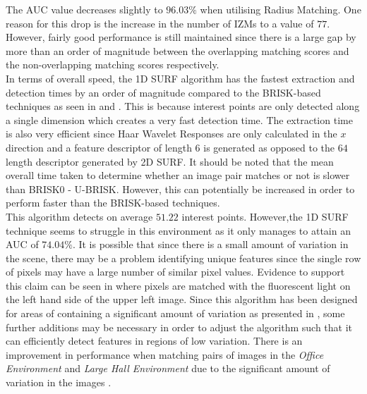 \documentclass[11pt]{report}
\begin{document}
The AUC value decreases slightly to $96.03\%$ when utilising Radius Matching. One reason for this drop is the increase in the number of IZMs to a value of $77$. However, fairly good performance is still maintained since there is a large gap by more than an order of magnitude between the overlapping matching scores and the non-overlapping matching scores respectively. \\



In terms of overall speed, the 1D SURF algorithm has the fastest extraction and detection times by an order of magnitude compared to the BRISK-based techniques as seen in  and . This is because interest points are only detected along a single dimension which creates a very fast detection time. The extraction time is also very efficient since Haar Wavelet Responses are only calculated in the $x$ direction and a feature descriptor of length $6$ is generated as opposed to the $64$ length descriptor generated by 2D SURF. It should be noted that the mean overall time taken to determine whether an image pair matches or not is slower than BRISK0 - U-BRISK. However, this can potentially be increased in order to perform faster than the BRISK-based techniques.\\

This algorithm detects on average $51.22$ interest points. However,the 1D SURF technique seems to struggle in this environment as it only manages to attain an AUC of $74.04\%$. It is possible that since there is a small amount of variation in the scene, there may be a problem identifying unique features since the single row of pixels may have a large number of similar pixel values. Evidence to support this claim can be seen in  where pixels are matched with the fluorescent light on the left hand side of the upper left image. Since this algorithm has been designed for areas of containing a significant amount of variation as presented in \cite{Anderson}, some further additions may be necessary in order to adjust the algorithm such that it can efficiently detect features in regions of low variation. There is an improvement in performance when matching pairs of images in the \textit{Office Environment} and \textit{Large Hall Environment} due to the significant amount of variation in the images .\\
\end{document}
